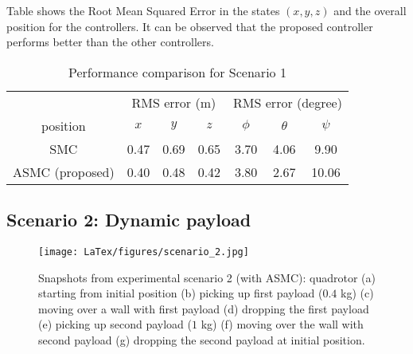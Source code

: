 Table shows the Root Mean Squared Error in the states $(x,y,z)$ and the overall position for the controllers. It can be observed that the proposed controller performs better than the other controllers.

\begin{table}[h!]
\renewcommand{\arraystretch}{1.1}
\caption{{Performance comparison for Scenario 1}}
\label{table 1}
		\centering
{
{	\begin{tabular}{c c c c c c c}
		\hline
		\hline
		& \multicolumn{3}{c}{RMS error (m)} & \multicolumn{3}{c}{RMS error (degree)}  \\ \cline{1-7}
		 position & $x$ & $y$  & $z$  & $\phi$ & $\theta$  & $\psi$  \\
		 \hline
		SMC & 0.47& 0.69  & 0.65 & 3.70 & 4.06  & 9.90 \\
		\hline
		ASMC (proposed)& {0.40} & {0.48}  & {0.42} & 3.80 & 2.67  & 10.06 \\
		\hline
		\hline
\end{tabular}}}
\end{table}
\clearpage

\subsection{Scenario 2: Dynamic payload}
\begin{figure*}
    \texttt{[image: LaTex/figures/scenario\_2.jpg]}
    \centering
    \caption{Snapshots from experimental scenario 2 (with ASMC): quadrotor (a) starting from initial position (b) picking up first payload ($0.4$ kg) (c) moving over a wall with first payload (d) dropping the first payload (e) picking up second payload ($1$ kg) (f) moving over the wall with second payload (g) dropping the second payload at initial position.}
    \label{fig:scn_exp2}
\end{figure*}

